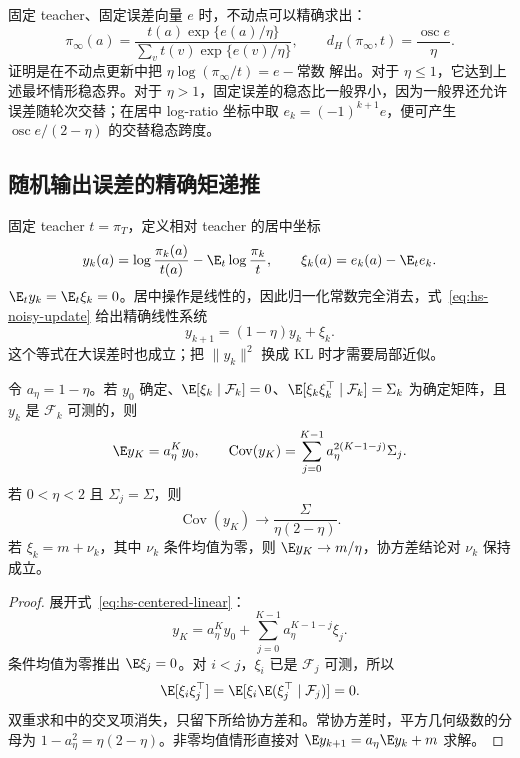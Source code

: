 固定 teacher、固定误差向量 $e$ 时，不动点可以精确求出：
\[
 \pi_\infty(a)=\frac{t(a)\exp\{e(a)/\eta\}}
 {\sum_v t(v)\exp\{e(v)/\eta\}},\qquad
 d_H(\pi_\infty,t)=\frac{\operatorname{osc}e}{\eta}.
\]
证明是在不动点更新中把 $\eta\log(\pi_\infty/t)=e-\text{常数}$ 解出。对于 $\eta\leq1$，它达到上述最坏情形稳态界。对于 $\eta>1$，固定误差的稳态比一般界小，因为一般界还允许误差随轮次交替；在居中 log-ratio 坐标中取 $e_k=(-1)^{k+1}e$，便可产生 $\operatorname{osc}e/(2-\eta)$ 的交替稳态跨度。

\subsection{随机输出误差的精确矩递推}

固定 teacher $t=\pi_T$，定义相对 teacher 的居中坐标
\[
 y_k(a)=\log\frac{\pi_k(a)}{t(a)}
       -\E_t\log\frac{\pi_k}{t},\qquad
 \xi_k(a)=e_k(a)-\E_te_k.
\]
$\E_ty_k=\E_t\xi_k=0$。居中操作是线性的，因此归一化常数完全消去，式~\eqref{eq:hs-noisy-update} 给出精确线性系统
\begin{equation}\label{eq:hs-centered-linear}
 y_{k+1}=(1-\eta)y_k+\xi_k.
\end{equation}
这个等式在大误差时也成立；把 $\|y_k\|^2$ 换成 KL 时才需要局部近似。

\begin{theorem}\label{thm:hs-covariance}
令 $a_\eta=1-\eta$。若 $y_0$ 确定、$\E[\xi_k\mid\mathcal F_k]=0$、$\E[\xi_k\xi_k^\top\mid\mathcal F_k]=\Sigma_k$ 为确定矩阵，且 $y_k$ 是 $\mathcal F_k$ 可测的，则
\[
 \E y_K=a_\eta^K y_0,\qquad
 \operatorname{Cov}(y_K)=\sum_{j=0}^{K-1}a_\eta^{2(K-1-j)}\Sigma_j.
\]
若 $0<\eta<2$ 且 $\Sigma_j=\Sigma$，则
\begin{equation}\label{eq:hs-stationary-cov}
 \operatorname{Cov}(y_K)\longrightarrow
       \frac{\Sigma}{\eta(2-\eta)}.
\end{equation}
若 $\xi_k=m+\nu_k$，其中 $\nu_k$ 条件均值为零，则 $\E y_K\to m/\eta$，协方差结论对 $\nu_k$ 保持成立。
\end{theorem}

\begin{proof}
展开式~\eqref{eq:hs-centered-linear}：
\[
 y_K=a_\eta^Ky_0+\sum_{j=0}^{K-1}a_\eta^{K-1-j}\xi_j.
\]
条件均值为零推出 $\E\xi_j=0$。对 $i<j$，$\xi_i$ 已是 $\mathcal F_j$ 可测，所以
\[
 \E[\xi_i\xi_j^\top]
 =\E[\xi_i\E(\xi_j^\top\mid\mathcal F_j)]=0.
\]
双重求和中的交叉项消失，只留下所给协方差和。常协方差时，平方几何级数的分母为 $1-a_\eta^2=\eta(2-\eta)$。非零均值情形直接对 $\E y_{k+1}=a_\eta\E y_k+m$ 求解。
\end{proof}

